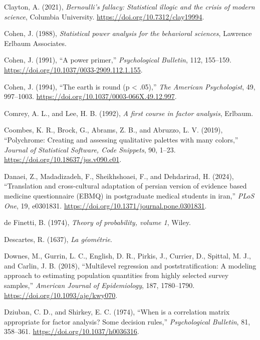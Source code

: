 \documentclass[
  10pt,
  a4paper,
  twoside]{article}
\newlength{\cslhangindent}
\newenvironment{CSLReferences}[2] %
 {\begin{list}{}{%
  \setlength{\itemindent}{0pt}
  \setlength{\leftmargin}{0pt}
  \setlength{\parsep}{0pt}
  \ifodd #1
   \setlength{\leftmargin}{\cslhangindent}
   \setlength{\itemindent}{-1\cslhangindent}
  \fi
  \setlength{\itemsep}{#2\baselineskip}}}
 {\end{list}}
\begin{document}
\begin{CSLReferences}{1}{0}
Clayton, A. (2021), \emph{Bernoulli's fallacy: Statistical illogic and the crisis of modern science}, Columbia University. \url{https://doi.org/10.7312/clay19994}.

Cohen, J. (1988), \emph{Statistical power analysis for the behavioral sciences}, Lawrence Erlbaum Associates.

Cohen, J. (1991), {``A power primer,''} \emph{Psychological Bulletin}, 112, 155--159. \url{https://doi.org/10.1037/0033-2909.112.1.155}.

Cohen, J. (1994), {``The earth is round (p \textless{} .05),''} \emph{The American Psychologist}, 49, 997--1003. \url{https://doi.org/10.1037/0003-066X.49.12.997}.

Comrey, A. L., and Lee, H. B. (1992), \emph{A first course in factor analysis}, Erlbaum.

Coombes, K. R., Brock, G., Abrams, Z. B., and Abruzzo, L. V. (2019), {``{Polychrome}: Creating and assessing qualitative palettes with many colors,''} \emph{Journal of Statistical Software, Code Snippets}, 90, 1--23. \url{https://doi.org/10.18637/jss.v090.c01}.

Danaei, Z., Madadizadeh, F., Sheikhshoaei, F., and Dehdarirad, H. (2024), {``Translation and cross-cultural adaptation of persian version of evidence based medicine questionnaire (EBMQ) in postgraduate medical students in iran,''} \emph{PLoS One}, 19, e0301831. \url{https://doi.org/10.1371/journal.pone.0301831}.

de Finetti, B. (1974), \emph{Theory of probability, volume 1}, Wiley.

Descartes, R. (1637), \emph{La géométrie}.

Downes, M., Gurrin, L. C., English, D. R., Pirkis, J., Currier, D., Spittal, M. J., and Carlin, J. B. (2018), {``Multilevel regression and poststratification: A modeling approach to estimating population quantities from highly selected survey samples,''} \emph{American Journal of Epidemiology}, 187, 1780--1790. \url{https://doi.org/10.1093/aje/kwy070}.

Dziuban, C. D., and Shirkey, E. C. (1974), {``When is a correlation matrix appropriate for factor analysis? Some decision rules,''} \emph{Psychological Bulletin}, 81, 358--361. \url{https://doi.org/10.1037/h0036316}.


\end{CSLReferences}
\end{document}
